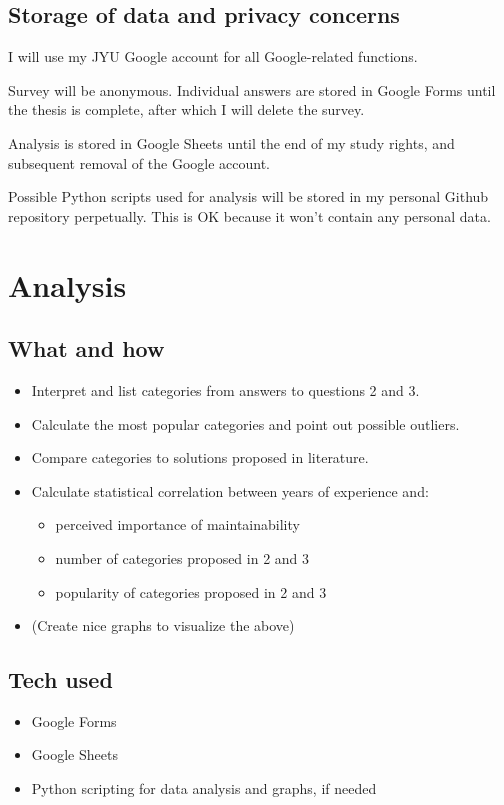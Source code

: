 \documentclass[utf8,english]{gradu3}
\begin{document}
\section{Storage of data and privacy concerns}
I will use my JYU Google account for all Google-related functions.

Survey will be anonymous.
Individual answers are stored in Google Forms until the thesis is complete,
after which I will delete the survey.

Analysis is stored in Google Sheets until the end of my study rights, and
subsequent removal of the Google account.

Possible Python scripts used for analysis will be stored in my personal Github repository
perpetually.
This is OK because it won't contain any personal data.


\chapter{Analysis}

\section{What and how}
\begin{itemize}
  \item Interpret and list categories from answers to questions 2 and 3.
  \item Calculate the most popular categories and point out possible outliers.
  \item Compare categories to solutions proposed in literature.
  \item Calculate statistical correlation between years of experience and:
        \begin{itemize}
          \item perceived importance of maintainability
          \item number of categories proposed in 2 and 3
          \item popularity of categories proposed in 2 and 3
        \end{itemize}
  \item (Create nice graphs to visualize the above)
\end{itemize}

\section{Tech used}
\begin{itemize}
  \item Google Forms
  \item Google Sheets
  \item Python scripting for data analysis and graphs, if needed
\end{itemize}


\printbibliography

\end{document}
